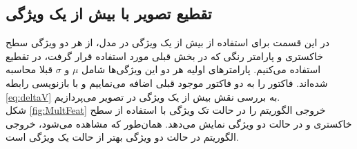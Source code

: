 \documentclass[11.5pt,a4paper]{article}
\begin{document}
 
\subsection{تقطیع تصویر با بیش از یک ویژگی}
در این قسمت برای استفاده از بیش از یک ویژگی در مدل، از هر دو ویژگی سطح خاکستری و پارامتر رنگی  که در بخش قبلی مورد استفاده قرار گرفت، در تقطیع استفاده می‌کنیم. پارامترهای اولیه هر دو این ویژگی‌ها شامل $\mu$ و $\sigma$ قبلا محاسبه شده‌اند. فاکتور  را به دو فاکتور موجود قبلی اضافه می‌نماییم و با بازنویسی رابطه 
\ref{eq:deltaV}
به بررسی نقش بیش از یک ویژگی در تصویر می‌پردازیم.
\\
شکل 
\ref{fig:MultFeat}
خروجی الگوریتم را در حالت تک ویژگی با استفاده از سطح خاکستری و در حالت دو ویژگی نمایش می‌دهد. همان‌طور که مشاهده می‌شود، خروجی الگوریتم در حالت دو ویژگی بهتر از حالت یک ‌ویژگی است.
\end{document}
